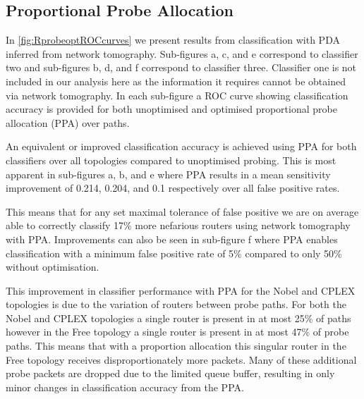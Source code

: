 \subsection{Proportional Probe Allocation}
\label{ssec:Rprobeallocation}
In \cref{fig:RprobeoptROCcurves} we present results from classification with PDA inferred from network tomography. Sub-figures a, c, and e correspond to classifier two and sub-figures b, d, and f correspond to classifier three. Classifier one is not included in our analysis here as the information it requires cannot be obtained via network tomography. In each sub-figure a ROC curve showing classification accuracy is provided for both unoptimised and optimised proportional probe allocation (PPA) over paths.\par
An equivalent or improved classification accuracy is achieved using PPA for both classifiers over all topologies compared to unoptimised probing. This is most apparent in sub-figures a, b, and e where PPA results in a mean sensitivity improvement of 0.214, 0.204, and 0.1 respectively over all false positive rates.\par
This means that for any set maximal tolerance of false positive we are on average able to correctly classify 17\% more nefarious routers using network tomography with PPA. Improvements can also be seen in sub-figure f where PPA enables classification with a minimum false positive rate of 5\% compared to only 50\% without optimisation.\par
This improvement in classifier performance with PPA for the Nobel and CPLEX topologies is due to the variation of routers between probe paths. For both the Nobel and CPLEX topologies a single router is present in at most 25\% of paths however in the Free topology a single router is present in at most 47\% of probe paths. This means that with a proportion allocation this singular router in the Free topology receives disproportionately more packets. Many of these additional probe packets are dropped due to the limited queue buffer, resulting in only minor changes in classification accuracy from the PPA.\par
\noindent
